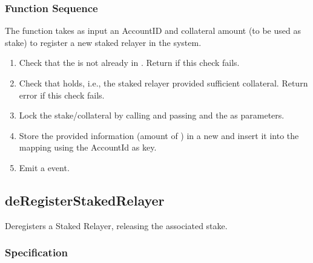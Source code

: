\documentclass[a4paper,10pt,english]{sphinxmanual}
\begin{document}
\subsubsection{Function Sequence}
\label{\detokenize{spec/staked-relayers:function-sequence}}
The  function takes as input an AccountID and collateral amount (to be used as stake) to register a new staked relayer in the system.
\begin{enumerate}
%
\item {} 
Check that the  is not already in . Return  if this check fails.

\item {} 
Check that  holds, i.e., the staked relayer provided sufficient collateral. Return  error if this check fails.

\item {} 
Lock the stake/collateral by calling {\hyperref[\detokenize{spec/collateral:lockcollateral}]{}} and passing  and the  as parameters.

\item {} 
Store the provided information (amount of ) in a new  and insert it into the  mapping using the  AccountId as key.

\item {} 
Emit a  event.

\end{enumerate}


\subsection{deRegisterStakedRelayer}
\label{\detokenize{spec/staked-relayers:deregisterstakedrelayer}}\label{\detokenize{spec/staked-relayers:id3}}
De\sphinxhyphen{}registers a Staked Relayer, releasing the associated stake.


\subsubsection{Specification}
\label{\detokenize{spec/staked-relayers:id4}}
\end{document}
